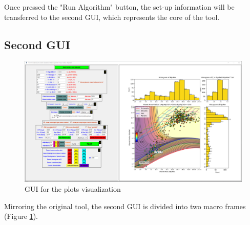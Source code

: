 \documentclass[preprint,12pt]{elsarticle}
\begin{document}
            Once pressed the "Run Algorithm" button, the set-up information will be transferred to the second GUI, which represents the core of the tool.

	    \subsection{Second GUI}   
	    
	        \begin{figure}[H]
        		\caption{GUI for the plots visualization}
        		\label{fig:GUI2}
        		\centering
        		\includegraphics[width=1\textwidth]{pictures/Manipulate_Planet_Code.PNG}
        	\end{figure}
        	
        	Mirroring the original tool, the second GUI is divided into two macro frames (Figure \ref{fig:GUI2}). 
\end{document}

